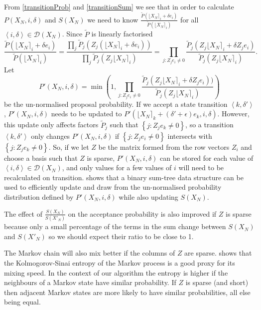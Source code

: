 \documentclass{article}
\begin{document}
From \eqref{transitionProb} and \eqref{transitionSum} we see that in order to calculate $P(X_N,i,\delta)$ and $S(X_N)$ we need to know $\frac{\tilde{P}(\lfloor X_N \rceil_i + \delta e_i)}{\tilde{P}(\lfloor X_N \rceil_i)}$ for all $\left<i,\delta\right> \in \mathcal{D}(X_N)$.  Since $\tilde{P}$ is linearly factorised
\[
\frac{\tilde{P}(\lfloor X_N \rceil_i + \delta e_i)}{\tilde{P}(\lfloor X_N \rceil_i)} =
\frac{\prod_j \tilde{P}_j(Z_j(\lfloor X_N \rceil_i + \delta e_i))}{\prod_j \tilde{P}_j(Z_j\lfloor X_N \rceil_i)} =
\prod_{j : Z_j e_i \ne 0} \frac{\tilde{P}_j(Z_j \lfloor X_N \rceil_i + \delta Z_j e_i)}{\tilde{P}_j(Z_j \lfloor X_N \rceil_i)}.
\]
Let
\[
P'(X_N,i,\delta) = \min\left(1, 
\prod_{j : Z_je_i \ne 0} \frac{\tilde{P}_j(Z_j \lfloor X_N \rceil_i + \delta Z_j e_i))}{\tilde{P}_j(Z_j \lfloor X_N \rceil_i)}\right)
\]
be the un-normalised proposal probability. If we accept a state transition $\left<k,\delta'\right>$, $P'(X_N,i,\delta)$ needs to be updated 
to $P'(\lfloor X_N \rceil_k + (\delta'+\epsilon)e_k, i, \delta)$. However, this update only affects factors $\tilde{P}_j$ such that  $\left\{j : Z_j e_k \ne 0 \right\}$, so a transition $\left<k,\delta'\right>$ only changes $P'(X_N,i,\delta)$ if $\left\{j : Z_je_i \ne 0\right\}$ intersects with $\left\{j : Z_je_k \ne 0\right\}$. So, if we let $Z$ be the matrix formed from the row vectors $Z_i$ and choose a basis such that $Z$ is sparse, $P'(X_N,i,\delta)$ can be stored for each value of $\left<i,\delta\right> \in \mathcal{D}(X_N)$, and only values for a few values of $i$ will need to be recalculated on transition. \citet{TangMutableCategorical} shows that a binary sum-tree data structure can be used to efficiently update and draw from the un-normalised probability distribution defined by $P'(X_N,i,\delta)$ while also updating $S(X_N)$.
 
The effect of $\frac{S(X_N)}{S(X'_N)}$ on the acceptance probability is also improved if $Z$ is sparse because only a small percentage of the terms in the sum change between $S(X_N)$ and $S(X'_N)$ so we should expect their ratio to be close to 1.

The Markov chain will also mix better if the columns of $Z$ are sparse. \citet{mihelich2018maximum} shows that the Kolmogorov-Sinai entropy of the Markov process is a good proxy for its mixing speed. In the context of our algorithm the entropy is higher if the neighbours of a Markov state have similar probability. If $Z$ is sparse (and short) then adjacent Markov states are more likely to have similar probabilities, all else being equal.
\end{document}
